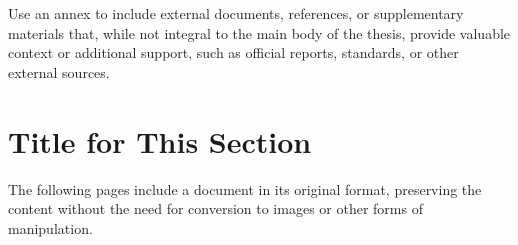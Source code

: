 

Use an annex to include external documents, references, or supplementary materials that, while not integral to the main body of the thesis, provide valuable context or additional support, such as official reports, standards, or other external sources.

\section{Title for This Section}
\label{Ann:Annex}

The following pages include a document in its original format, preserving the content without the need for conversion to images or other forms of manipulation.





